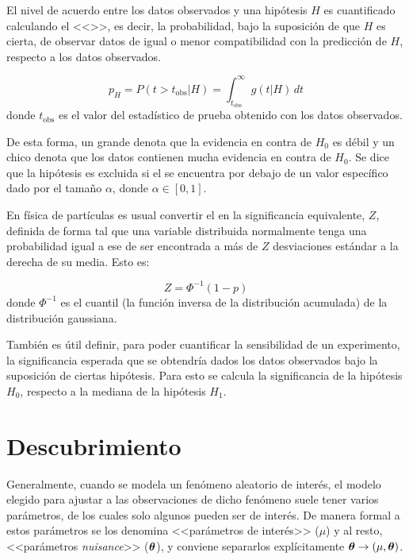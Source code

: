 El nivel de acuerdo entre los datos observados y una hipótesis $H$ es
cuantificado calculando el <<\pvalue>>, es decir, la probabilidad, bajo la
suposición de que $H$ es cierta, de observar datos de igual o menor
compatibilidad con la predicción de $H$, respecto a los datos observados.

\begin{equation}
  p_H = P(t>t_\text{obs}|H) = \int_{t_\text{obs}}^{\infty} g(t|H) \, dt
\end{equation}
%
donde $t_\text{obs}$ es el valor del estadístico de prueba obtenido con los
datos observados.

De esta forma, un {\pvalue} grande denota que la evidencia en contra de $H_0$ es
débil y un {\pvalue} chico denota que los datos contienen mucha evidencia en
contra de $H_0$.
Se dice que la hipótesis es excluida si el {\pvalue} se encuentra por debajo de un valor
específico dado por el tama\~no $\alpha$, donde $\alpha \in [0,1]$.

En física de partículas es usual convertir el {\pvalue} en la significancia
equivalente, $Z$, definida de forma tal que una variable distribuida normalmente
tenga una probabilidad igual a ese {\pvalue} de ser encontrada a más de $Z$
desviaciones estándar a la derecha de su media. Esto es:

\begin{equation}
  Z = \Phi^{-1}(1-p)
\end{equation}
%
donde $\Phi^{-1}$ es el cuantil (la función inversa de la distribución
acumulada) de la distribución gaussiana.

También es útil definir, para poder cuantificar la sensibilidad de un experimento,
la significancia esperada que se obtendría dados los datos observados bajo la
suposición de ciertas hipótesis.
Para esto se calcula la significancia de la hipótesis $H_0$, respecto
a la mediana de la hipótesis $H_1$.


\section{Descubrimiento}

Generalmente, cuando se modela un fenómeno aleatorio de interés, el modelo
elegido para ajustar a las observaciones de dicho fenómeno suele tener varios
parámetros, de los cuales solo algunos pueden ser de interés. De manera formal a
estos parámetros se los denomina <<parámetros de interés>> ($\mu$) y al resto, <<parámetros
\emph{nuisance}>> ($\bm{\theta}$), y conviene separarlos explícitamente $\bm{\theta} \rightarrow (\mu, \bm{\theta})$.

